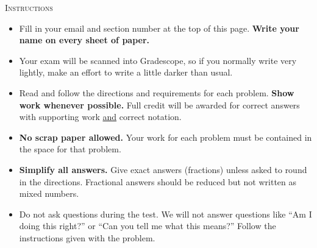 \thispagestyle{firststyle}


\noindent \textsc{Instructions}
\begin{small}
\begin{itemize}
\item Fill in your email and section number at the top of this page. \textbf{Write your name on every sheet of paper.}
\item Your exam will be scanned into Gradescope, so if you normally write very lightly, make an effort to write a little darker than usual.
\item Read and follow the directions and requirements for each problem. \textbf{Show work whenever possible.} Full credit will be awarded for correct answers with supporting work \underline{and} correct notation.
\item \textbf{No scrap paper allowed.} Your work for each problem must be contained in the space for that problem.
\item \textbf{Simplify all answers.} Give exact answers (fractions) unless asked to round in the directions. Fractional answers should be reduced but not written as mixed numbers.
\item Do not ask questions during the test. We will not answer questions like ``Am I doing this right?'' or ``Can you tell me what this means?'' Follow the instructions given with the problem.\\
\end{itemize}
\end{small}

